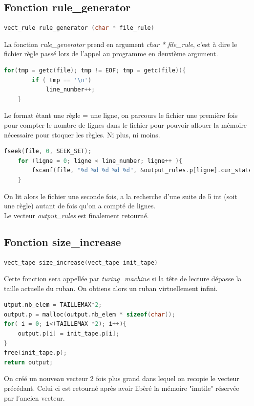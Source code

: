 \documentclass[12pt,a4paper]{report}
\begin{document}
\subsection{Fonction rule\_generator}
\begin{lstlisting}[language=c]
vect_rule rule_generator (char * file_rule)
\end{lstlisting}
La fonction \textit{rule\_generator} prend en argument \textit{char * file\_rule}, c'est à dire le fichier règle passé lors de l'appel au programme en deuxième argument.
\begin{lstlisting}[language=c]
for(tmp = getc(file); tmp != EOF; tmp = getc(file)){
		if ( tmp == '\n')
			line_number++;
	}
\end{lstlisting}
Le format étant une règle = une ligne, on parcours le fichier une première fois pour compter le nombre de lignes dans le fichier pour pouvoir allouer la mémoire nécessaire pour stoquer les règles. Ni plus, ni moins.
\begin{lstlisting}[language=c]
fseek(file, 0, SEEK_SET);
	for (ligne = 0; ligne < line_number; ligne++ ){
		fscanf(file, "%d %d %d %d %d", &output_rules.p[ligne].cur_state, &output_rules.p[ligne].symbol, &output_rules.p[ligne].new_symbol, &output_rules.p[ligne].direction, &output_rules.p[ligne].new_state);
	}
\end{lstlisting}
On lit alors le fichier une seconde fois, a la recherche d'une suite de 5 int (soit une règle) autant de fois qu'on a compté de lignes.\\
Le vecteur \textit{output\_rules} est finalement retourné.
\subsection{Fonction size\_increase}
\begin{lstlisting}[language=c]
vect_tape size_increase(vect_tape init_tape)
\end{lstlisting}
Cette fonction sera appellée par \textit{turing\_machine} si la tête de lecture dépasse la taille actuelle du ruban. On obtiens alors un ruban virtuellement infini.
\begin{lstlisting}[language=c]
utput.nb_elem = TAILLEMAX*2; 
output.p = malloc(output.nb_elem * sizeof(char));
for( i = 0; i<(TAILLEMAX *2); i++){
	output.p[i] = init_tape.p[i];
}
free(init_tape.p);
return output;
\end{lstlisting}
On créé un nouveau vecteur 2 fois plus grand dans lequel on recopie le vecteur précédant. Celui ci est retourné après avoir libèré la mémoire "inutile" réservée par l'ancien vecteur.
\end{document}
